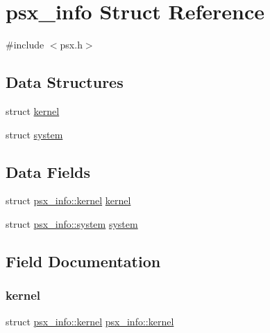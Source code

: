 \hypertarget{structpsx__info}{}\section{psx\+\_\+info Struct Reference}
\label{structpsx__info}


{\ttfamily \#include $<$psx.\+h$>$}

\subsection*{Data Structures}
\begin{DoxyCompactItemize}
\item 
struct \hyperlink{structpsx__info_1_1kernel}{kernel}
\item 
struct \hyperlink{structpsx__info_1_1system}{system}
\end{DoxyCompactItemize}
\subsection*{Data Fields}
\begin{DoxyCompactItemize}
\item 
struct \hyperlink{structpsx__info_1_1kernel}{psx\+\_\+info\+::kernel} \hyperlink{structpsx__info_adeb1aaa7707f76854f8a7f4e403b62c8}{kernel}
\item 
struct \hyperlink{structpsx__info_1_1system}{psx\+\_\+info\+::system} \hyperlink{structpsx__info_a12e85860d4398f8d56ab61da080e91b7}{system}
\end{DoxyCompactItemize}


\subsection{Field Documentation}
\mbox{\label{structpsx__info_adeb1aaa7707f76854f8a7f4e403b62c8}} 
\subsubsection{\texorpdfstring{kernel}{kernel}}
{\footnotesize\ttfamily struct \hyperlink{structpsx__info_1_1kernel}{psx\+\_\+info\+::kernel} \hyperlink{structpsx__info_1_1kernel}{psx\+\_\+info\+::kernel}}

\mbox{\label{structpsx__info_a12e85860d4398f8d56ab61da080e91b7}} 
